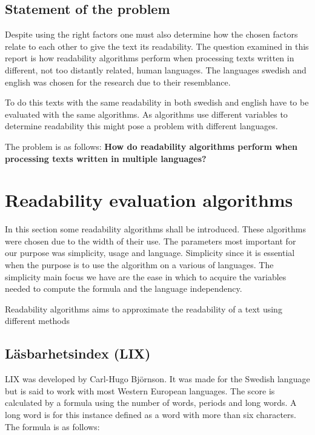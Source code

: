 \documentclass[a4paper]{article}
\begin{document}
\subsection{Statement of the problem}
Despite  using  the  right  factors  one  must  also determine how the chosen factors relate to each other to give the text its readability. The question examined in this report is how readability algorithms perform when processing texts written in different, not too distantly related, human languages. The languages swedish and english was chosen for the research due to their resemblance. 

To do this texts with the same readability in both swedish and english have to be evaluated with the same algorithms. As algorithms use different variables to determine readability this might pose a problem with different languages.

The problem is as follows:
\newline
\newline
\textbf{How do readability algorithms perform when processing texts written in multiple languages?}
\section{Readability evaluation algorithms}

In this section some readability algorithms shall be introduced. These algorithms were chosen due to the width of their use. The parameters most important for our purpose was simplicity, usage and language. Simplicity since it is essential when the purpose is to use the algorithm on a various of languages. The simplicity main focus we have are the ease in which to acquire the variables needed to compute the formula and the language independency.

Readability algorithms aims to approximate the readability of a text using different methods

\subsection{Läsbarhetsindex (LIX)}

LIX was developed by Carl-Hugo Björnson\cite{reck}. It was made for the Swedish language but is said to work with most Western European languages\cite{brown}. The score is calculated by a formula using the number of words, periods and long words. A long word is for this instance defined as a word with more than six characters. The formula is as follows\cite{reck, bjornsson68}:
\end{document}

